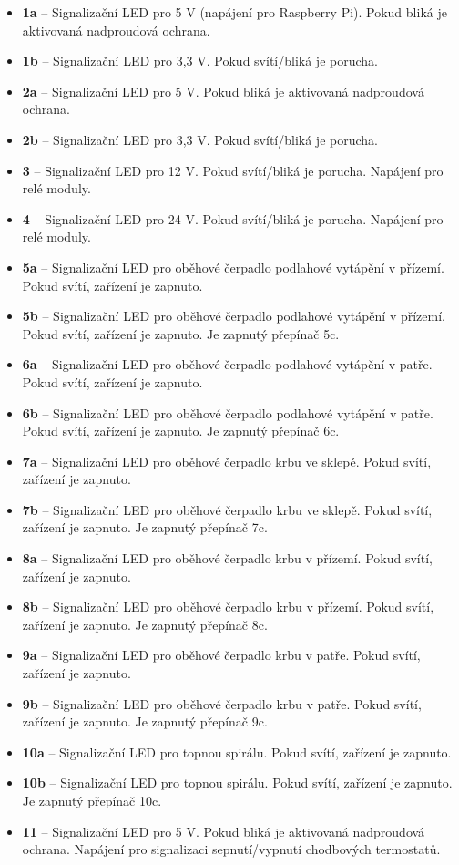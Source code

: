 \begin{Czech}
\begin{itemize}
  \item \textbf{1a} – Signalizační LED pro 5 V (napájení pro Raspberry Pi). Pokud bliká je aktivovaná nadproudová ochrana.
  \item \textbf{1b} – Signalizační LED pro 3,3 V. Pokud svítí/bliká je porucha.
  \item \textbf{2a} – Signalizační LED pro 5 V. Pokud bliká je aktivovaná nadproudová ochrana.
  \item \textbf{2b} – Signalizační LED pro 3,3 V. Pokud svítí/bliká je porucha.
  \item \textbf{3} – Signalizační LED pro 12 V. Pokud svítí/bliká je porucha. Napájení pro relé moduly.
  \item \textbf{4} – Signalizační LED pro 24 V. Pokud svítí/bliká je porucha. Napájení pro relé moduly.
  \item \textbf{5a} – Signalizační LED pro oběhové čerpadlo podlahové vytápění v přízemí. Pokud svítí, zařízení je zapnuto. 
    \item \textbf{5b} – Signalizační LED pro oběhové čerpadlo podlahové vytápění v přízemí. Pokud svítí, zařízení je zapnuto. Je zapnutý přepínač 5c.
  \item \textbf{6a} – Signalizační LED pro oběhové čerpadlo podlahové vytápění v patře. Pokud svítí, zařízení je zapnuto.
    \item \textbf{6b} – Signalizační LED pro oběhové čerpadlo podlahové vytápění v patře. Pokud svítí, zařízení je zapnuto. Je zapnutý přepínač 6c.
  \item \textbf{7a} – Signalizační LED pro oběhové čerpadlo krbu ve sklepě. Pokud svítí, zařízení je zapnuto.
    \item \textbf{7b} – Signalizační LED pro oběhové čerpadlo krbu ve sklepě. Pokud svítí, zařízení je zapnuto. Je zapnutý přepínač 7c.
  \item \textbf{8a} – Signalizační LED pro oběhové čerpadlo krbu v přízemí. Pokud svítí, zařízení je zapnuto.
    \item \textbf{8b} – Signalizační LED pro oběhové čerpadlo krbu v přízemí. Pokud svítí, zařízení je zapnuto. Je zapnutý přepínač 8c.
  \item \textbf{9a} – Signalizační LED pro oběhové čerpadlo krbu v patře. Pokud svítí, zařízení je zapnuto. 
    \item \textbf{9b} – Signalizační LED pro oběhové čerpadlo krbu v patře. Pokud svítí, zařízení je zapnuto. Je zapnutý přepínač 9c.
  \item \textbf{10a} – Signalizační LED pro topnou spirálu. Pokud svítí, zařízení je zapnuto.
  \item \textbf{10b} – Signalizační LED pro topnou spirálu. Pokud svítí, zařízení je zapnuto.  Je zapnutý přepínač 10c. 
    \item \textbf{11} – Signalizační LED pro 5 V. Pokud bliká je aktivovaná nadproudová ochrana. Napájení pro signalizaci sepnutí/vypnutí chodbových termostatů.
\end{itemize}
\end{Czech}

